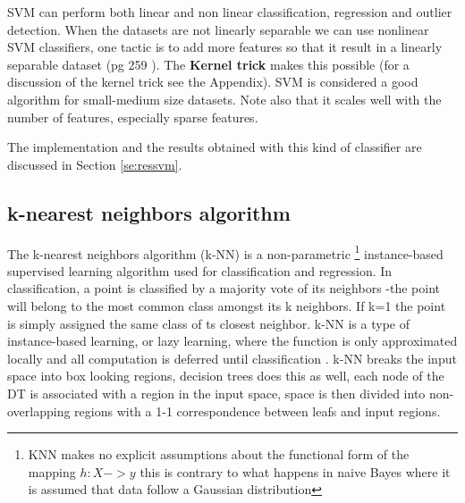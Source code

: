 \documentclass[11pt]{article}
\begin{document}

SVM can perform both linear and non linear classification, regression and outlier detection. When the datasets are not linearly separable we can use nonlinear SVM classifiers, one tactic is to add more features so that it result in a linearly separable dataset (pg 259 \cite{geron2017hands}). The \textbf{Kernel trick} makes this possible (for a discussion of the kernel trick see the Appendix). SVM is considered a good algorithm for small-medium size datasets. Note also that it scales well with the number of features, especially sparse features. 

The implementation and the results obtained with this kind of classifier are discussed in Section \ref{se:ressvm}.

\subsection{k-nearest neighbors algorithm}
\label{se:reskneighbors}
The k-nearest neighbors algorithm (k-NN) is a non-parametric \footnote{KNN makes no explicit assumptions about the functional form of the mapping $h:X->y$ this is contrary to what happens in naive Bayes where it is assumed that data follow a Gaussian distribution} instance-based supervised learning algorithm used for classification and regression. In classification, a point is classified by a majority vote of its neighbors -the point will belong to the most common class amongst its k neighbors. If k=1 the point is simply assigned the same class of ts closest neighbor.
k-NN is a type of instance-based learning, or lazy learning, where the function is only approximated locally and all computation is deferred until classification \cite{keller1985fuzzy}. k-NN breaks the input space into box looking regions, decision trees does this as well, each node of the DT is associated with a region in the input space, space is then divided into non-overlapping regions with a 1-1 correspondence between leafs and input regions.
\end{document}
